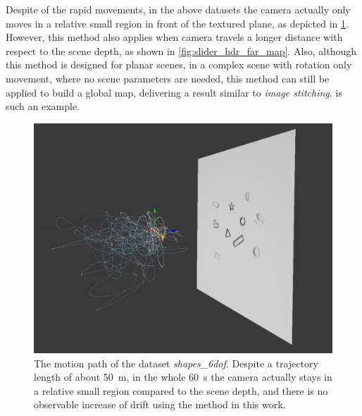   Despite of the rapid movements, in the above datasets the camera
  actually only moves in a relative small region in front of the
  textured plane, as depicted in \cref{fig:shapes_6dof_path}. However,
  this method also applies when camera travels a longer distance with
  respect to the scene depth, as shown in
  \cref{fig:slider_hdr_far_map}. Also, although this method is
  designed for planar scenes, in a complex scene with rotation only
  movement, where no scene parameters are needed, this method can
  still be applied to build a global map, delivering a result similar
  to \textit{image stitching}.  is such
  an example.
  \begin{figure}[h]
    \centering
    \includegraphics[width=\textwidth]{images/shapes_6dof_path.png}
    \caption{The motion path of the dataset
      \textit{shapes\_6dof}. Despite a trajectory length of about
      \SI{50}{\meter}, in the whole \SI{60}{\second} the camera
      actually stays in a relative small region compared to the scene
      depth, and there is no observable increase of drift using the
      method in this work.}
    \label{fig:shapes_6dof_path}
  \end{figure}
